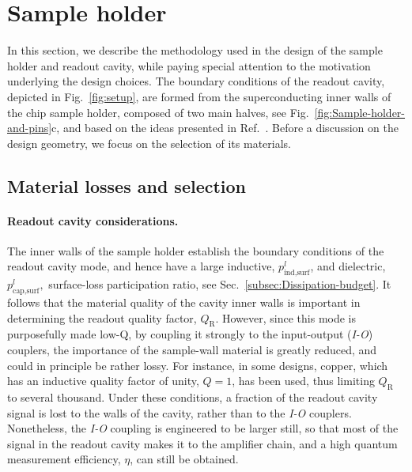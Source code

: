\section{Sample holder \label{sec:Sample-holder-materials}}

In this section, we describe the methodology used in the design of
the sample holder and readout cavity, while paying special attention
to the motivation underlying the design choices. The boundary conditions
of the readout cavity, depicted in Fig.~\ref{fig:setup}, are formed
from the superconducting inner walls of the chip sample holder, composed
of two main halves, see Fig.~\ref{fig:Sample-holder-and-pins}c,
and based on the ideas presented in Ref.~\citet{Paik2011}. Before
a discussion on the design geometry, we focus on the selection of
its materials.

\subsection{Material losses and selection \label{subsec:sample-holder-material-selection}}

\paragraph{Readout cavity considerations.}

The inner walls of the sample holder establish the boundary conditions
of the readout cavity mode, and hence have a large inductive, $p_{\text{ind,surf}}^{l}$,
and dielectric, $p_{\text{cap,surf}}^{l},$ surface-loss participation
ratio, see Sec.~\ref{subsec:Dissipation-budget}. It follows that
the material quality of the cavity inner walls is important in determining
the readout quality factor, $Q_{\mathrm{R}}$. However, since this
mode is purposefully made low-Q, by coupling it strongly to the input-output
(\emph{I-O}) couplers, the importance of the sample-wall material
is greatly reduced, and could in principle be rather lossy. For instance,
in some designs, copper, which has an inductive quality factor of
unity,  $Q=1$, has been used, thus limiting $Q_{\mathrm{R}}$ to
several thousand. Under these conditions, a fraction of the readout
cavity signal is lost to the walls of the cavity, rather than to the
\emph{I-O} couplers. Nonetheless, the \emph{I-O} coupling is engineered
to be larger still, so that most of the signal in the readout cavity
makes it to the amplifier chain, and a high quantum measurement efficiency,
$\eta$, can still be obtained. 

